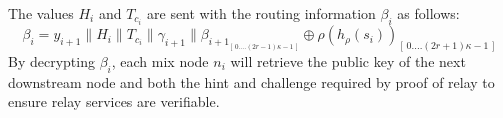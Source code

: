 The values $H_i$ and $T_{c_i}$ are sent with the routing information $\beta_i$ as follows:
$$\beta_i=y_{i+1}\|H_i\|T_{c_i}\|\gamma_{i+1}\|\beta_{{i+1}_{[ \,0....(2r-1)\kappa-1\,] }}\oplus \rho(h_{\rho}(s_{i}))_{[ \,0....(2r+1)\kappa-1\,]}$$
By decrypting $\beta_i$, each mix node $n_i$ will retrieve the public key of the next downstream node and both the hint and challenge required by proof of relay to ensure relay services are verifiable.

\begin{comment}
 \begin{figure}[H]
    \centering
    \begin{tabular}{| m{2em} | m{15em} | m{2em} |}
        \hline
        $\alpha$ & $\beta$                   & $\gamma$ \\
                 & \begin{tabular}{| c m{2em} | m{3em} | m{6em} |}
            \hline
            \multicolumn{2}{| c |}{$Y_B$} & $hint_B$                 & $challenge_{BC}$ \\
            \hline
            \multicolumn{2}{| c |}{$Y_C$} & $hint_C$                 & $random$         \\
            \hline
            \multicolumn{2}{| c |}{$Y_D$} & $hint_D$                 & $random$         \\
            \hline
            End                           & \multicolumn{3}{| l |}{}                    \\
            \hline
        \end{tabular} &          \\[3em]
        \hline
    \end{tabular}
    \caption{Sphinx with PoR}
    \label{fig:Sphinx with PoR}
\end{figure}
\end{comment}
